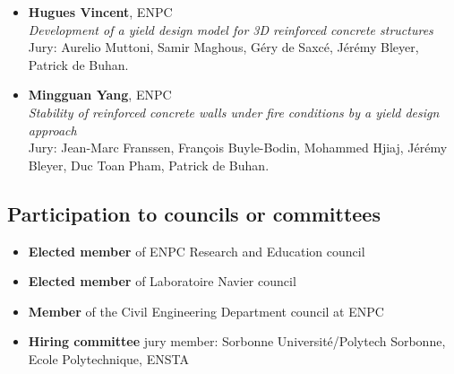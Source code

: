 \begin{itemize}[noitemsep]
\item[2018] \textbf{Hugues Vincent}, ENPC\\
\textit{Development of a yield design model for 3D reinforced concrete structures}\\
Jury: Aurelio Muttoni, Samir Maghous, Géry de Saxcé, Jérémy Bleyer,  Patrick de Buhan.

\item[2018] \textbf{Mingguan Yang}, ENPC\\
\textit{Stability of reinforced concrete walls under fire conditions by a yield design approach}\\
Jury: Jean-Marc Franssen, François Buyle-Bodin, Mohammed Hjiaj, Jérémy Bleyer, Duc Toan Pham, Patrick de Buhan.
\end{itemize}


\subsection*{Participation to councils or committees}

\begin{itemize}[noitemsep]
\item[] \textbf{Elected member} of ENPC Research and Education council
\item[] \textbf{Elected member} of Laboratoire Navier council
\item[] \textbf{Member} of the Civil Engineering Department council at ENPC
\item[] \textbf{Hiring committee} jury member: Sorbonne Université/Polytech Sorbonne, Ecole Polytechnique, ENSTA
\end{itemize}

